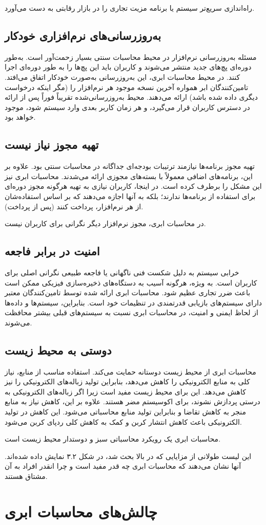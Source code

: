 \documentclass{book}
\begin{document}
    راه‌اندازی سریع‌تر سیستم یا برنامه مزیت تجاری را در بازار رقابتی به دست می‌آورد.

    \subsection{به‌روزرسانی‌های نرم‌افزاری خودکار}
    مسئله به‌روزرسانی نرم‌افزار در محیط محاسبات سنتی بسیار زحمت‌آور است. به‌طور دوره‌ای پچ‌های جدید منتشر می‌شوند و کاربران باید این پچ‌ها را به طور دوره‌ای اجرا کنند. در محیط محاسبات ابری، این به‌روزرسانی به‌صورت خودکار اتفاق می‌افتد. تامین‌کنندگان ابر همواره آخرین نسخه موجود هر نرم‌افزار را (مگر اینکه درخواست دیگری داده شده باشد) ارائه می‌دهند. محیط به‌روزرسانی‌شده تقریباً فوراً پس از ارائه در دسترس کاربران قرار می‌گیرد، و هر زمان کاربر بعدی وارد سیستم شود، موجود خواهد بود.

    \subsection{تهیه مجوز نیاز نیست}
    تهیه مجوز برنامه‌ها نیازمند ترتیبات بودجه‌ای جداگانه در محاسبات سنتی بود. علاوه بر این، برنامه‌های اضافی معمولاً با بسته‌های مجوزی ارائه می‌شدند. محاسبات ابری نیز این مشکل را برطرف کرده است. در اینجا، کاربران نیازی به تهیه هرگونه مجوز دوره‌ای برای استفاده از برنامه‌ها ندارند؛ بلکه به آنها اجازه می‌دهند که بر اساس استفاده‌شان از هر نرم‌افزار، پرداخت کنند (پس از پرداخت).
    
    در محاسبات ابری، مجوز نرم‌افزار دیگر نگرانی برای کاربران نیست.

    \subsection{امنیت در برابر فاجعه}
    خرابی سیستم به دلیل شکست فنی ناگهانی یا فاجعه طبیعی نگرانی اصلی برای کاربران است. به ویژه، هرگونه آسیب به دستگاه‌های ذخیره‌سازی فیزیکی ممکن است باعث ضرر تجاری عظیم شود. محاسبات ابری ارائه شده توسط تامین‌کنندگان معتبر دارای سیستم‌های بازیابی قدرتمندی در تنظیمات خود است. بنابراین، سیستم‌ها و داده‌ها از لحاظ ایمنی و امنیت، در محاسبات ابری نسبت به سیستم‌های قبلی بیشتر محافظت می‌شوند.

    \subsection{دوستی به محیط زیست}
    محاسبات ابری از محیط زیست دوستانه حمایت می‌کند. استفاده مناسب از منابع، نیاز کلی به منابع الکترونیکی را کاهش می‌دهد، بنابراین تولید زباله‌های الکترونیکی را نیز کاهش می‌دهد. این برای محیط زیست مفید است زیرا اگر زباله‌های الکترونیکی به درستی پردازش نشوند، برای اکوسیستم مضر هستند. علاوه بر این، کاهش نیاز به منابع منجر به کاهش تقاضا و بنابراین تولید منابع محاسباتی می‌شود. این کاهش در تولید الکترونیکی باعث کاهش انتشار کربن و کمک به کاهش کلی ردپای کربن می‌شود.

    محاسبات ابری یک رویکرد محاسباتی سبز و دوستدار محیط زیست است.


    این لیست طولانی از مزایایی که در بالا بحث شد، در شکل ۳.۲ نمایش داده شده‌اند. آنها نشان می‌دهند که محاسبات ابری چه قدر مفید است و چرا انقدر افراد به آن مشتاق هستند.


    \section{چالش‌های محاسبات ابری}
\end{document}
